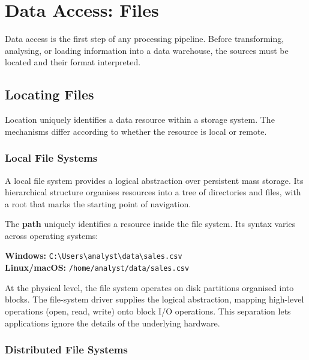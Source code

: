 
\section{Data Access: Files}
\label{part:file-access}

Data access is the first step of any processing pipeline. Before transforming, analysing, or loading information into a data warehouse, the sources must be located and their format interpreted.

\subsection{Locating Files}
\label{sec:file-location}

Location uniquely identifies a data resource within a storage system. The mechanisms differ according to whether the resource is local or remote.

\subsubsection{Local File Systems}
\label{subsec:local-fs}

A local file system provides a logical abstraction over persistent mass storage. Its hierarchical structure organises resources into a tree of directories and files, with a root that marks the starting point of navigation.

The \textbf{path} uniquely identifies a resource inside the file system. Its syntax varies across operating systems:

\begin{examplebox}
{\scriptsize
\textbf{Windows:} \texttt{C:\textbackslash Users\textbackslash analyst\textbackslash data\textbackslash sales.csv}\\
\textbf{Linux/macOS:} \texttt{/home/analyst/data/sales.csv}
}
\end{examplebox}

At the physical level, the file system operates on disk partitions organised into blocks. The file-system driver supplies the logical abstraction, mapping high-level operations (open, read, write) onto block I/O operations. This separation lets applications ignore the details of the underlying hardware.

\subsubsection{Distributed File Systems}
\label{subsec:distributed-fs}

